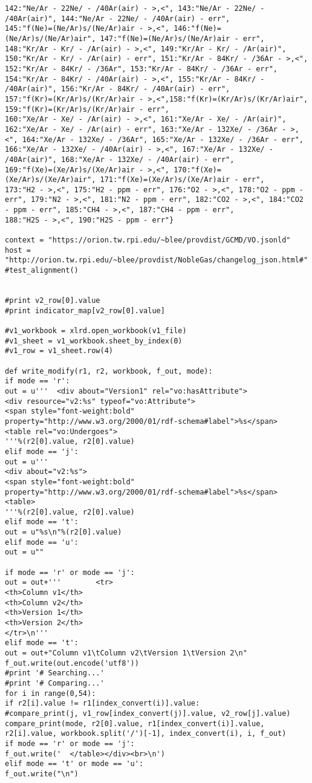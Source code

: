 \begin{verbatim}
142:"Ne/Ar - 22Ne/ - /40Ar(air) - >,<", 143:"Ne/Ar - 22Ne/ - /40Ar(air)", 144:"Ne/Ar - 22Ne/ - /40Ar(air) - err",
145:"f(Ne)=(Ne/Ar)s/(Ne/Ar)air - >,<", 146:"f(Ne)=(Ne/Ar)s/(Ne/Ar)air", 147:"f(Ne)=(Ne/Ar)s/(Ne/Ar)air - err",
148:"Kr/Ar - Kr/ - /Ar(air) - >,<", 149:"Kr/Ar - Kr/ - /Ar(air)", 150:"Kr/Ar - Kr/ - /Ar(air) - err", 151:"Kr/Ar - 84Kr/ - /36Ar - >,<", 152:"Kr/Ar - 84Kr/ - /36Ar", 153:"Kr/Ar - 84Kr/ - /36Ar - err",
154:"Kr/Ar - 84Kr/ - /40Ar(air) - >,<", 155:"Kr/Ar - 84Kr/ - /40Ar(air)", 156:"Kr/Ar - 84Kr/ - /40Ar(air) - err",
157:"f(Kr)=(Kr/Ar)s/(Kr/Ar)air - >,<",158:"f(Kr)=(Kr/Ar)s/(Kr/Ar)air", 159:"f(Kr)=(Kr/Ar)s/(Kr/Ar)air - err",
160:"Xe/Ar - Xe/ - /Ar(air) - >,<", 161:"Xe/Ar - Xe/ - /Ar(air)", 162:"Xe/Ar - Xe/ - /Ar(air) - err", 163:"Xe/Ar - 132Xe/ - /36Ar - >,<", 164:"Xe/Ar - 132Xe/ - /36Ar", 165:"Xe/Ar - 132Xe/ - /36Ar - err",
166:"Xe/Ar - 132Xe/ - /40Ar(air) - >,<", 167:"Xe/Ar - 132Xe/ - /40Ar(air)", 168:"Xe/Ar - 132Xe/ - /40Ar(air) - err",
169:"f(Xe)=(Xe/Ar)s/(Xe/Ar)air - >,<", 170:"f(Xe)=(Xe/Ar)s/(Xe/Ar)air", 171:"f(Xe)=(Xe/Ar)s/(Xe/Ar)air - err",
173:"H2 - >,<", 175:"H2 - ppm - err", 176:"O2 - >,<", 178:"O2 - ppm - err", 179:"N2 - >,<", 181:"N2 - ppm - err", 182:"CO2 - >,<", 184:"CO2 - ppm - err", 185:"CH4 - >,<", 187:"CH4 - ppm - err",
188:"H2S - >,<", 190:"H2S - ppm - err"}

context = "https://orion.tw.rpi.edu/~blee/provdist/GCMD/VO.jsonld"
host = "http://orion.tw.rpi.edu/~blee/provdist/NobleGas/changelog_json.html#"
#test_alignment()


#print v2_row[0].value
#print indicator_map[v2_row[0].value]

#v1_workbook = xlrd.open_workbook(v1_file)
#v1_sheet = v1_workbook.sheet_by_index(0)
#v1_row = v1_sheet.row(4)

def write_modify(r1, r2, workbook, f_out, mode):
if mode == 'r':
out = u'''  <div about="Version1" rel="vo:hasAttribute">
<div resource="v2:%s" typeof="vo:Attribute">
<span style="font-weight:bold" property="http://www.w3.org/2000/01/rdf-schema#label">%s</span>
<table rel="vo:Undergoes">
'''%(r2[0].value, r2[0].value)
elif mode == 'j':
out = u'''
<div about="v2:%s">
<span style="font-weight:bold" property="http://www.w3.org/2000/01/rdf-schema#label">%s</span>
<table>
'''%(r2[0].value, r2[0].value)
elif mode == 't':
out = u"%s\n"%(r2[0].value)
elif mode == 'u':
out = u""

if mode == 'r' or mode == 'j':
out = out+'''        <tr>
<th>Column v1</th>
<th>Column v2</th>
<th>Version 1</th>
<th>Version 2</th>
</tr>\n'''
elif mode == 't':
out = out+"Column v1\tColumn v2\tVersion 1\tVersion 2\n"
f_out.write(out.encode('utf8'))
#print '# Searching...'
#print '# Comparing...'
for i in range(0,54):
if r2[i].value != r1[index_convert(i)].value:
#compare_print(j, v1_row[index_convert(j)].value, v2_row[j].value)
compare_print(mode, r2[0].value, r1[index_convert(i)].value, r2[i].value, workbook.split('/')[-1], index_convert(i), i, f_out)
if mode == 'r' or mode == 'j':
f_out.write('  </table></div><br>\n')
elif mode == 't' or mode == 'u':
f_out.write("\n")


\end{verbatim}
